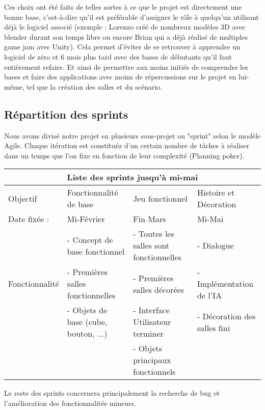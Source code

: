 \documentclass[a4paper,11pt]{article}
\begin{document}
Ces choix ont été faits de telles sortes à ce que le projet est directement une bonne base, 
c’est-à-dire qu’il est préférable d’assigner le rôle à quelqu'un utilisant déjà le logiciel 
associé (exemple : Lorenzo créé de nombreux modèles 3D avec blender durant son temps libre ou encore
 Brian qui a déjà réalisé de multiples game jam avec Unity). Cela permet d'éviter de se retrouver à 
 apprendre un logiciel de zéro et 6 mois plus tard avec des bases de débutants qu’il faut entièrement refaire.
Et ainsi de permettre aux moins initiés de comprendre les bases et faire des applications avec 
moins de répercussions sur le projet en lui-même, tel que la création des salles et du scénario.

\subsection{Répartition des sprints}

Nous avons divisé notre projet en plusieurs sous-projet ou "sprint" selon le modèle Agile.
Chaque itération est constituéz d'un certain nombre de tâches à réaliser dans un temps que l'on fixe 
en fonction de leur complexité (Planning poker).\newline



\begin{tabular}{ |p{3cm}|p{3cm}|p{3cm}|p{3cm}|  }
 \hline
 \multicolumn{4}{|c|}{Liste des sprints jusqu'à mi-mai} \\
 \hline
 Objectif& Fonctionnalité de base  & Jeu fonctionnel & Histoire et Décoration\\
 \hline
 \hline
 Date fixée : & Mi-Février & Fin Mars & Mi-Mai\\
 \hline
 \multirow{3}{4em}{Fonctionnalité} & - Concept de base fonctionnel & - Toutes les salles sont fonctionnelles & - Dialogue\\ 
 & - Premières salles fonctionnelles & - Premières salles décorées & - Implémentation de l'IA\\ 
 & - Objets de base (cube, bouton, ...) & - Interface Utilisateur terminer & - Décoration des salles fini\\ 
 & & - Objets principaux fonctionnels & \\

 \hline
\end{tabular}


Le reste des sprints concernera principalement la recherche de bug et l'amélioration des 
fonctionnalités mineurs.
\end{document}
